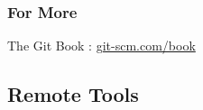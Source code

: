 \documentclass{beamer}
\begin{document}



















\begin{frame}[fragile]
\frametitle{For More}
The Git Book : \href{https://git-scm.com/book}{git-scm.com/book}
\end{frame}

\subsection{Remote Tools}


\end{document}
